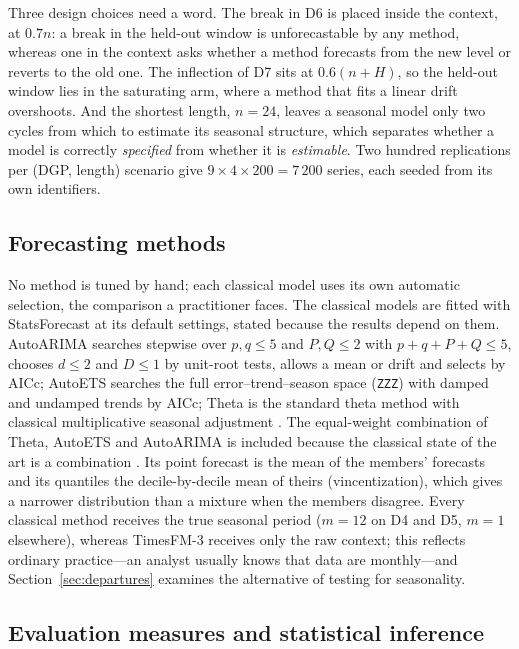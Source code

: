 \documentclass[ASNA]{USG}
\newcommand{\pkg}[1]{\textsf{#1}}
\newcommand{\code}[1]{\texttt{#1}}
\providecommand{\sectionref}[1]{Section~\ref{#1}}
\begin{document}
Three design choices need a word. The break in D6 is placed inside the context, at $0.7n$: a break in the
held-out window is unforecastable by any method, whereas one in the context asks whether a method
forecasts from the new level or reverts to the old one. The inflection of D7 sits at $0.6(n+H)$, so the
held-out window lies in the saturating arm, where a method that fits a linear drift overshoots. And the
shortest length, $n = 24$, leaves a seasonal model only two cycles from which to estimate its seasonal
structure, which separates whether a model is correctly \emph{specified} from whether it is
\emph{estimable}. Two hundred replications per (DGP, length) scenario give $9 \times 4 \times 200 = 7\,200$
series, each seeded from its own identifiers.

\subsection{Forecasting methods}
\label{sec:methods}

No method is tuned by hand; each classical model uses its own automatic selection, the comparison a
practitioner faces. The classical models are fitted with \pkg{StatsForecast} \citep{statsforecast} at its
default settings, stated because the results depend on them. AutoARIMA searches stepwise over $p, q \le 5$
and $P, Q \le 2$ with $p + q + P + Q \le 5$, chooses $d \le 2$ and $D \le 1$ by unit-root tests, allows a
mean or drift and selects by AICc; AutoETS searches the full error--trend--season space (\code{ZZZ}) with
damped and undamped trends by AICc; Theta is the standard theta method with classical multiplicative
seasonal adjustment \citep{hyndman2021fpp}. The equal-weight combination of Theta, AutoETS and AutoARIMA
is included because the classical state of the art is a combination \citep{makridakis2020m4,
petropoulos2022theory}. Its point forecast is the mean of the members' forecasts and its quantiles the
decile-by-decile mean of theirs (vincentization), which gives a narrower distribution than a mixture when
the members disagree. Every classical method receives the true seasonal period ($m = 12$ on D4 and D5,
$m = 1$ elsewhere), whereas TimesFM-3 receives only the raw context; this reflects ordinary practice---an
analyst usually knows that data are monthly---and \sectionref{sec:departures} examines the alternative of
testing for seasonality.

\subsection{Evaluation measures and statistical inference}
\label{sec:evaluation}
\end{document}
